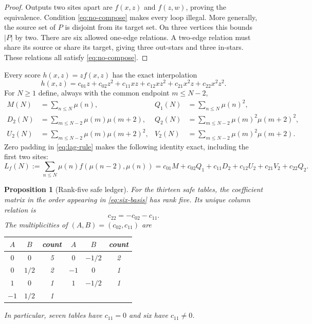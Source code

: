 \documentclass[11pt]{article}
\newtheorem{proposition}[theorem]{Proposition}
\theoremstyle{definition}
\theoremstyle{remark}
\newcommand{\mob}{\mu}
\begin{document}
\begin{proof}
Outputs two sites apart are $f(x,z)$ and $f(z,w)$, proving the equivalence.
Condition \eqref{eq:no-compose} makes every loop illegal.  More generally,
the source set of $P$ is disjoint from its target set.  On three vertices
this bounds $|P|$ by two.  There are six allowed one-edge relations.  A
two-edge relation must share its source or share its target, giving three
out-stars and three in-stars.  These relations all satisfy
\eqref{eq:no-compose}.
\end{proof}

Every score $h(x,z)=zf(x,z)$ has the exact interpolation
\begin{equation}
 h(x,z)=c_{01}z+c_{02}z^2+c_{11}xz+c_{12}xz^2
             +c_{21}x^2z+c_{22}x^2z^2.
 \label{eq:six-basis}
\end{equation}
For $N\ge1$ define, always with the common endpoint $m\le N-2$,
\begin{align*}
 M(N)&=\sum_{n\le N}\mob(n),& Q_1(N)&=\sum_{n\le N}\mob(n)^2,\\
 D_2(N)&=\sum_{m\le N-2}\mob(m)\mob(m+2),&
 Q_2(N)&=\sum_{m\le N-2}\mob(m)^2\mob(m+2)^2,\\
 U_2(N)&=\sum_{m\le N-2}\mob(m)\mob(m+2)^2,&
 V_2(N)&=\sum_{m\le N-2}\mob(m)^2\mob(m+2).
\end{align*}
Zero padding in \eqref{eq:lag-rule} makes the following identity exact,
including the first two sites:
\begin{equation}
 L_f(N):=\sum_{n\le N}\mob(n)f(\mob(n-2),\mob(n))
 =c_{01}M+c_{02}Q_1+c_{11}D_2+c_{12}U_2+c_{21}V_2+c_{22}Q_2.
 \label{eq:ledger}
\end{equation}

\begin{proposition}[Rank-five safe ledger]
\label{prop:rank-five}
For the thirteen safe tables, the coefficient matrix in the order appearing
in \eqref{eq:six-basis} has rank five.  Its unique column relation is
\begin{equation}
                         c_{22}=-c_{02}-c_{11}.
                         \label{eq:relation}
\end{equation}
The multiplicities of $(A,B)=(c_{02},c_{11})$ are
\begin{center}
\begin{tabular}{ccc@{\qquad}ccc}
\toprule
$A$&$B$&count&$A$&$B$&count\\
\midrule
$0$&$0$&5&$0$&$-1/2$&2\\
$0$&$1/2$&2&$-1$&$0$&1\\
$1$&$0$&1&$1$&$-1/2$&1\\
$-1$&$1/2$&1&&&\\
\bottomrule
\end{tabular}
\end{center}
In particular, seven tables have $c_{11}=0$ and six have $c_{11}\ne0$.
\end{proposition}
\end{document}
